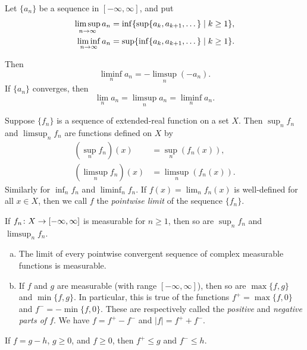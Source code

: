 \begin{definition}
  Let $\{a_n\}$ be a sequence in $[-\infty,\infty]$, and put
  \begin{align*}
    \limsup_{n \rightarrow \infty} a_n &= \inf\{ \sup\{ a_k, a_{k+1}, \dots \} \;|\; k \geq 1 \}, \\
    \liminf_{n \rightarrow \infty} a_n &= \sup\{ \inf\{ a_k, a_{k+1}, \dots \} \;|\; k \geq 1 \}.
  \end{align*}
\end{definition}

Then
\[
\liminf_n a_n = -\limsup_n(-a_n).
\]
If $\{a_n\}$ converges, then
\[
\lim_n a_n = \limsup_n a_n = \liminf_n a_n.
\]

Suppose $\{f_n\}$ is a sequence of extended-real function on a set $X$. Then $\sup_n f_n$ and $\limsup_n f_n$ are functions defined on $X$ by
\begin{align*}
  \left( \sup_n f_n \right)(x) &= \sup_n(f_n(x)), \\
  \left( \limsup_n f_n \right)(x) &= \limsup_n(f_n(x)).
\end{align*}
Similarly for $\inf_n f_n$ and $\liminf_n f_n$. If $f(x) = \lim_n f_n(x)$ is well-defined for all $x \in X$, then we call $f$ the \emph{pointwise limit} of the sequence $\{f_n\}$.

\begin{theorem}
  If $f_n \colon X \rightarrow [-\infty,\infty]$ is measurable for $n \geq 1$, then so are $\sup_n f_n$ and $\limsup_n f_n$.
\end{theorem}

\begin{corollary}
  \mbox{}
  \begin{enumerate}[(a)]
  \item The limit of every pointwise convergent sequence of complex measurable functions is measurable.
  \item If $f$ and $g$ are measurable (with range $[-\infty,\infty]$), then so are $\max\{f,g\}$ and $\min\{f,g\}$. In particular, this is true of the functions $f^+ = \max\{f,0\}$ and $f^- = -\min\{f,0\}$. These are respectively called the \emph{positive} and \emph{negative parts of $f$}. We have $f = f^+ - f^-$ and $|f| = f^+ + f^-$.
  \end{enumerate}
\end{corollary}

\begin{proposition}
  If $f = g-h$, $g \geq 0$, and $f \geq 0$, then $f^+ \leq g$ and $f^- \leq h$.
\end{proposition}

